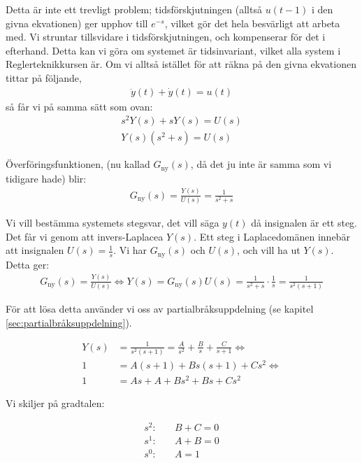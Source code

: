 \documentclass[a4paper]{article}
\begin{document}
Detta är inte ett trevligt problem; tidsförskjutningen (alltså $u(t-1)$ i den givna ekvationen) ger upphov till $e^{-s}$, vilket gör det hela besvärligt att arbeta med. Vi struntar tillsvidare i tidsförskjutningen, och kompenserar för det i efterhand. Detta kan vi göra om systemet är tidsinvariant, vilket alla system i Reglerteknikkursen är. Om vi alltså istället för att räkna på den givna ekvationen tittar på följande,
\begin{align*}
  \ddot{y}(t) + \dot{y}(t) = u(t)
\end{align*}
så får vi på samma sätt som ovan:
\begin{align*}
  s^2Y(s) + sY(s) = U(s) \\
  Y(s)(s^2 + s) = U(s)
\end{align*}

Överföringsfunktionen, (nu kallad $G_{\text{ny}}(s)$, då det ju inte är samma som vi tidigare hade) blir:
\begin{align*}
  G_{\text{ny}}(s) = \frac{Y(s)}{U(s)} = \frac{1}{s^2 + s}
\end{align*}

Vi vill bestämma systemets stegsvar, det vill säga $y(t)$ då insignalen är ett steg. Det får vi genom att invers-Laplacea $Y(s)$. Ett steg i Laplacedomänen innebär att insignalen $U(s) = \frac{1}{s}$. Vi har $G_{\text{ny}}(s)$ och $U(s)$, och vill ha ut $Y(s)$. Detta ger:
\begin{align*}
  G_{\text{ny}}(s) = \frac{Y(s)}{U(s)} \Longleftrightarrow Y(s) = G_{\text{ny}}(s)U(s) = \frac{1}{s^2 + s} \cdot \frac{1}{s} = \frac{1}{s^2(s + 1)}
\end{align*}

För att lösa detta använder vi oss av partialbråksuppdelning (se kapitel \ref{sec:partialbråksuppdelning}).

\begin{align*}
  Y(s) &= \frac{1}{s^2(s + 1)} = \frac{A}{s^2} + \frac{B}{s} + \frac{C}{s+1} \Longleftrightarrow \\
  1 &= A(s + 1) + Bs(s + 1) + Cs^2 \Longleftrightarrow \\
  1 &= As + A + Bs^2 + Bs + Cs^2
\end{align*}

Vi skiljer på gradtalen:

\begin{align*}
  s^2: & \quad B + C = 0\\
  s^1: & \quad A + B = 0\\
  s^0: & \quad A     = 1
\end{align*}
\end{document}
